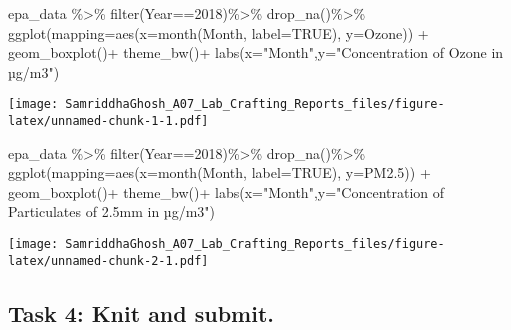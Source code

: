 \documentclass[
]{article}
\newenvironment{Shaded}{\begin{snugshade}}{\end{snugshade}}
\newcommand{\AttributeTok}[1]{\textcolor[rgb]{0.77,0.63,0.00}{#1}}
\newcommand{\ConstantTok}[1]{\textcolor[rgb]{0.00,0.00,0.00}{#1}}
\newcommand{\DecValTok}[1]{\textcolor[rgb]{0.00,0.00,0.81}{#1}}
\newcommand{\FloatTok}[1]{\textcolor[rgb]{0.00,0.00,0.81}{#1}}
\newcommand{\FunctionTok}[1]{\textcolor[rgb]{0.00,0.00,0.00}{#1}}
\newcommand{\NormalTok}[1]{#1}
\newcommand{\SpecialCharTok}[1]{\textcolor[rgb]{0.00,0.00,0.00}{#1}}
\newcommand{\StringTok}[1]{\textcolor[rgb]{0.31,0.60,0.02}{#1}}
\begin{document}
\begin{Shaded}
\begin{Highlighting}[]
\NormalTok{epa\_data }\SpecialCharTok{\%\textgreater{}\%}
  \FunctionTok{filter}\NormalTok{(Year}\SpecialCharTok{==}\DecValTok{2018}\NormalTok{)}\SpecialCharTok{\%\textgreater{}\%}
  \FunctionTok{drop\_na}\NormalTok{()}\SpecialCharTok{\%\textgreater{}\%}
  \FunctionTok{ggplot}\NormalTok{(}\AttributeTok{mapping=}\FunctionTok{aes}\NormalTok{(}\AttributeTok{x=}\FunctionTok{month}\NormalTok{(Month, }\AttributeTok{label=}\ConstantTok{TRUE}\NormalTok{), }
                     \AttributeTok{y=}\NormalTok{Ozone)) }\SpecialCharTok{+}
           \FunctionTok{geom\_boxplot}\NormalTok{()}\SpecialCharTok{+}
           \FunctionTok{theme\_bw}\NormalTok{()}\SpecialCharTok{+}
           \FunctionTok{labs}\NormalTok{(}\AttributeTok{x=}\StringTok{"Month"}\NormalTok{,}\AttributeTok{y=}\StringTok{"Concentration of Ozone in µg/m3"}\NormalTok{)}
\end{Highlighting}
\end{Shaded}

\texttt{[image: SamriddhaGhosh\_A07\_Lab\_Crafting\_Reports\_files/figure-latex/unnamed-chunk-1-1.pdf]}

\begin{Shaded}
\begin{Highlighting}[]
\NormalTok{epa\_data }\SpecialCharTok{\%\textgreater{}\%}
  \FunctionTok{filter}\NormalTok{(Year}\SpecialCharTok{==}\DecValTok{2018}\NormalTok{)}\SpecialCharTok{\%\textgreater{}\%}
  \FunctionTok{drop\_na}\NormalTok{()}\SpecialCharTok{\%\textgreater{}\%}
  \FunctionTok{ggplot}\NormalTok{(}\AttributeTok{mapping=}\FunctionTok{aes}\NormalTok{(}\AttributeTok{x=}\FunctionTok{month}\NormalTok{(Month, }\AttributeTok{label=}\ConstantTok{TRUE}\NormalTok{), }
                     \AttributeTok{y=}\NormalTok{PM2}\FloatTok{.5}\NormalTok{)) }\SpecialCharTok{+}
           \FunctionTok{geom\_boxplot}\NormalTok{()}\SpecialCharTok{+}
           \FunctionTok{theme\_bw}\NormalTok{()}\SpecialCharTok{+}
           \FunctionTok{labs}\NormalTok{(}\AttributeTok{x=}\StringTok{"Month"}\NormalTok{,}\AttributeTok{y=}\StringTok{"Concentration of Particulates of 2.5mm in µg/m3"}\NormalTok{)}
\end{Highlighting}
\end{Shaded}

\texttt{[image: SamriddhaGhosh\_A07\_Lab\_Crafting\_Reports\_files/figure-latex/unnamed-chunk-2-1.pdf]}

\hypertarget{task-4-knit-and-submit.}{%
\subsection{Task 4: Knit and submit.}\label{task-4-knit-and-submit.}}
\end{document}
